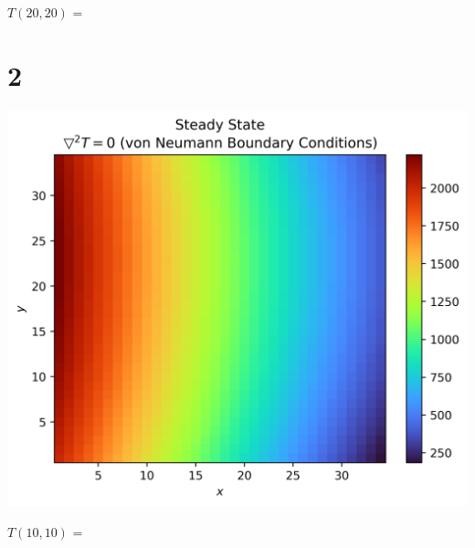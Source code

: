 \documentclass{article}
\begin{document}
$T(20, 20)$ = 

\section*{2}

\begin{center}
    \includegraphics*[scale=0.8]{2.png}
\end{center}

$T(10, 10)$ = 
\end{document}
